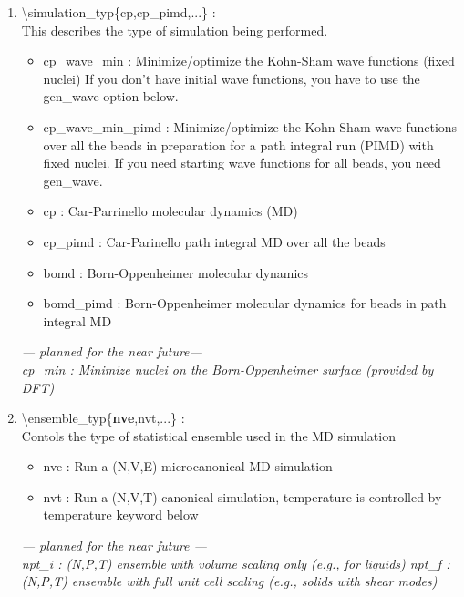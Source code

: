 \documentclass[12pt,titlepage]{article}
\begin{document}
\begin{enumerate}
 \vspace{0.15in}
 \item \textbackslash simulation\_typ\{cp,cp\_pimd,...\} : \\
     This describes the type of simulation being performed.
     \begin{itemize}
\item     cp\_wave\_min : Minimize/optimize the Kohn-Sham wave functions (fixed nuclei)
              If you don't have initial wave functions, you have to
	      use the gen\_wave option below.
\item cp\_wave\_min\_pimd : Minimize/optimize the Kohn-Sham wave functions
		   over all the beads in preparation for a path
		   integral run (PIMD) with fixed nuclei.  If you need
		   starting wave functions for all beads, you need gen\_wave.
\item cp : Car-Parrinello molecular dynamics (MD)
\item cp\_pimd : Car-Parinello path integral MD over all the beads
\item bomd : Born-Oppenheimer molecular dynamics
\item bomd\_pimd : Born-Oppenheimer molecular dynamics for beads in path integral MD
\end{itemize}
{\it
--- planned for the near future---\\
cp\_min : Minimize nuclei on the Born-Oppenheimer surface (provided by DFT)
}
 

 \vspace{0.15in} 
 \item  \textbackslash ensemble\_typ\{{\bf nve},nvt,...\} : \\
Contols the type of statistical ensemble used in the MD simulation
\begin{itemize}
\item nve : Run a (N,V,E) microcanonical MD simulation
\item nvt : Run a (N,V,T) canonical simulation, temperature is controlled by 
      temperature keyword below
\end{itemize}
{\it
--- planned for the near future ---\\
npt\_i : (N,P,T) ensemble with volume scaling only (e.g., for liquids)
npt\_f : (N,P,T) ensemble with full unit cell scaling  (e.g., solids
        with shear modes)
}



\end{enumerate}
\end{document}
